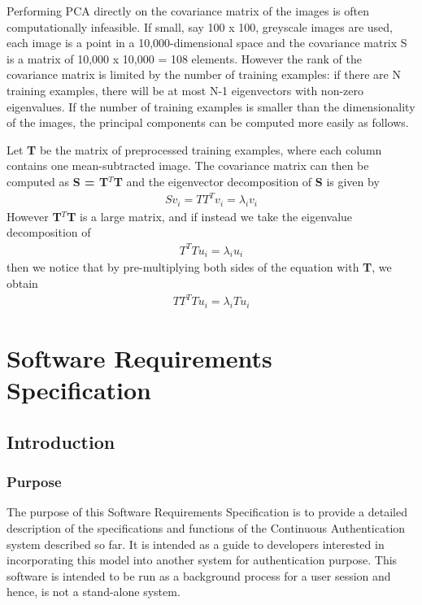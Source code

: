 \documentclass[12pt]{article}			%
\begin{document}

Performing PCA directly on the covariance matrix of the images is often computationally infeasible. If small, say 100 x 100, greyscale images are used, each image is a point in a 10,000-dimensional space and the covariance matrix S is a matrix of 10,000 x 10,000 = 108 elements. However the rank of the covariance matrix is limited by the number of training examples: if there are N training examples, there will be at most N-1 eigenvectors with non-zero eigenvalues. If the number of training examples is smaller than the dimensionality of the images, the principal components can be computed more easily as follows.

Let {\bf T} be the matrix of preprocessed training examples, where each column contains one mean-subtracted image. The covariance matrix can then be computed as {\bf S = T$^{T}$T} and the eigenvector decomposition of {\bf S} is given by\\
\begin{align*}
Sv_{i} = TT^{T}v_{i} = \lambda_{i}v_{i}
\end{align*}
However {\bf T$^{T}$T } is a large matrix, and if instead we take the eigenvalue decomposition of
\begin{align*}
T^{T}Tu_{i} = \lambda_{i}u_{i}
\end{align*}
then we notice that by pre-multiplying both sides of the equation with {\bf T}, we obtain
\begin{align*}
TT^{T}Tu_{i} = \lambda_{i}Tu_{i}
\end{align*}
\newpage
\section{Software Requirements Specification }
\subsection{ Introduction }

\subsubsection{ Purpose }
The purpose of this Software Requirements Specification is to provide a detailed description of the specifications and functions of the Continuous Authentication system described so far. It is intended as a guide to developers interested in incorporating this model into another system for authentication purpose. This software is intended to be run as a background process for a user session and hence, is not a stand-alone system. 
\end{document}
